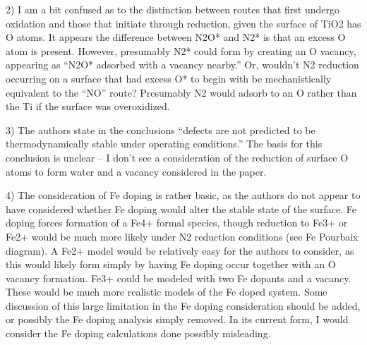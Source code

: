 2)       I am a bit confused as to the distinction between routes that first undergo oxidation and those that initiate through reduction, given the surface of TiO2 has O atoms.  It appears the difference between N2O* and N2* is that an excess O atom is present.  However, presumably N2* could form by creating an O vacancy, appearing as “N2O* adsorbed with a vacancy nearby.”  Or, wouldn’t N2 reduction occurring on a surface that had excess O* to begin with be mechanistically equivalent to the “NO” route?  Presumably N2 would adsorb to an O rather than the Ti if the surface was overoxidized.



3)      The authors state in the conclusions “defects are not predicted to be thermodynamically stable under operating conditions.”  The basis for this conclusion is unclear – I don’t see a consideration of the reduction of surface O atoms to form water and a vacancy considered in the paper.

4)      The consideration of Fe doping is rather basic, as the authors do not appear to have considered whether Fe doping would alter the stable state of the surface.  Fe doping forces formation of a Fe4+ formal species, though reduction to Fe3+ or Fe2+ would be much more likely under N2 reduction conditions (see Fe Pourbaix diagram).  A Fe2+ model would be relatively easy for the authors to consider, as this would likely form simply by having Fe doping occur together with an O vacancy formation.   Fe3+ could be modeled with two Fe dopants and a vacancy.  These would be much more realistic models of the Fe doped system.  Some discussion of this large limitation in the Fe doping consideration should be added, or possibly the Fe doping analysis simply removed.  In its current form, I would consider the Fe doping calculations done possibly misleading.

